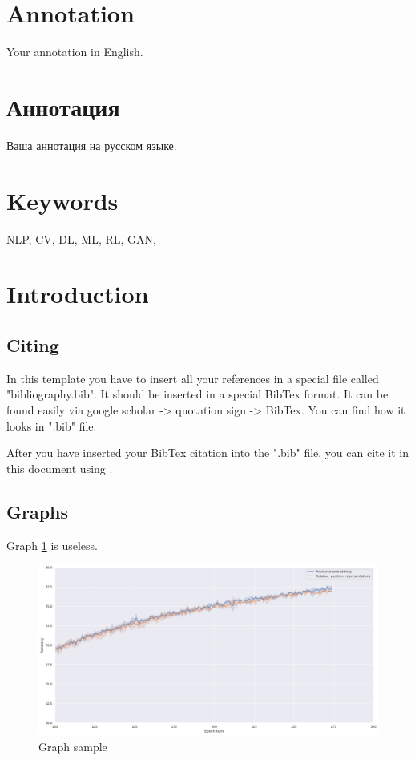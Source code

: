 \documentclass[a4paper,14pt]{extarticle}
\begin{document}
\newpage

{
	\hypersetup{linkcolor=black}
	\tableofcontents
}

\newpage
\section*{Annotation} 

Your annotation in English.

\section*{\foreignlanguage{russian}{Аннотация}}   %
\foreignlanguage{russian}{
    Ваша аннотация на русском языке.
}

\section*{Keywords}
NLP, CV, DL, ML, RL, GAN, 
\pagebreak

\section{Introduction}

\subsection{Citing}

In this template you have to insert all your references in a special file 
called "bibliography.bib". It should be inserted in a special BibTex format. 
It can be found easily via google scholar -> quotation sign -> BibTex. You can find how it looks in ".bib" file.

After you have inserted your BibTex citation into the ".bib" file, you can cite it in this document using \cite{vaswani2017}.

\subsection{Graphs}

Graph \ref{fig:by_epochs} is useless.

\begin{figure}[h!]
	\centering
	\includegraphics[width=1\textwidth]{graph2.png}
	\caption{Graph sample}
	\label{fig:by_epochs}
\end{figure}
\end{document}
